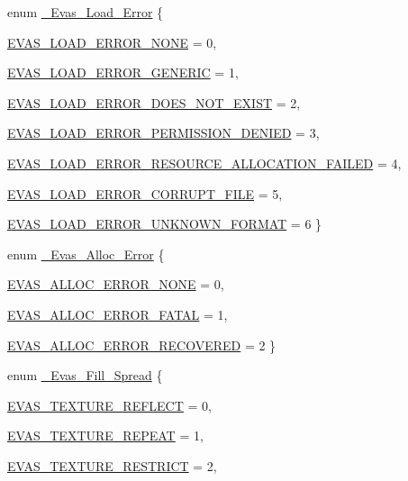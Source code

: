 \begin{DoxyCompactItemize}
enum \hyperlink{Evas_8h_ac6e5fe4a54ab26d2d9ceaefff0962b5f}{\_\-Evas\_\-Load\_\-Error} \{ \par
\hyperlink{Evas_8h_ac6e5fe4a54ab26d2d9ceaefff0962b5fa016233a6ae27765a3aa2759753c112ac}{EVAS\_\-LOAD\_\-ERROR\_\-NONE} =  0, 
\par
\hyperlink{Evas_8h_ac6e5fe4a54ab26d2d9ceaefff0962b5fab9e5061c8c74bcd8a283fb7598a8b81d}{EVAS\_\-LOAD\_\-ERROR\_\-GENERIC} =  1, 
\par
\hyperlink{Evas_8h_ac6e5fe4a54ab26d2d9ceaefff0962b5fa0230814bb1fe9cb194e253e840aa8529}{EVAS\_\-LOAD\_\-ERROR\_\-DOES\_\-NOT\_\-EXIST} =  2, 
\par
\hyperlink{Evas_8h_ac6e5fe4a54ab26d2d9ceaefff0962b5fa17e04ec01edcabf21f33537872fb7200}{EVAS\_\-LOAD\_\-ERROR\_\-PERMISSION\_\-DENIED} =  3, 
\par
\hyperlink{Evas_8h_ac6e5fe4a54ab26d2d9ceaefff0962b5fa22a36ddde85a5fd1c1f2e68d7052f6f4}{EVAS\_\-LOAD\_\-ERROR\_\-RESOURCE\_\-ALLOCATION\_\-FAILED} =  4, 
\par
\hyperlink{Evas_8h_ac6e5fe4a54ab26d2d9ceaefff0962b5fa7ba46c8865335ca085213b7dbf039a75}{EVAS\_\-LOAD\_\-ERROR\_\-CORRUPT\_\-FILE} =  5, 
\par
\hyperlink{Evas_8h_ac6e5fe4a54ab26d2d9ceaefff0962b5fa604b6c7bf6345c773d3083707d9f0a80}{EVAS\_\-LOAD\_\-ERROR\_\-UNKNOWN\_\-FORMAT} =  6
 \}
\item 
enum \hyperlink{Evas_8h_a1adf9f604f763f2a8db12a484ca199cb}{\_\-Evas\_\-Alloc\_\-Error} \{ \par
\hyperlink{Evas_8h_a1adf9f604f763f2a8db12a484ca199cba22bbdd0a96a670bbddd6789f91921af8}{EVAS\_\-ALLOC\_\-ERROR\_\-NONE} =  0, 
\par
\hyperlink{Evas_8h_a1adf9f604f763f2a8db12a484ca199cbaba4052a7c95452ff5c6f2b615a655d8e}{EVAS\_\-ALLOC\_\-ERROR\_\-FATAL} =  1, 
\par
\hyperlink{Evas_8h_a1adf9f604f763f2a8db12a484ca199cba5c6259613c3d063813f3b094f9d5bf8e}{EVAS\_\-ALLOC\_\-ERROR\_\-RECOVERED} =  2
 \}
\item 
enum \hyperlink{Evas_8h_a830349cff0c676505905e79e1db0f738}{\_\-Evas\_\-Fill\_\-Spread} \{ \par
\hyperlink{Evas_8h_a830349cff0c676505905e79e1db0f738a31a744eacb64fea060a008aafc7ff760}{EVAS\_\-TEXTURE\_\-REFLECT} =  0, 
\par
\hyperlink{Evas_8h_a830349cff0c676505905e79e1db0f738ab47a8ad83b953d575eeb18d94626d5e2}{EVAS\_\-TEXTURE\_\-REPEAT} =  1, 
\par
\hyperlink{Evas_8h_a830349cff0c676505905e79e1db0f738a78f264dbe65169a29f4c08e62cc57136}{EVAS\_\-TEXTURE\_\-RESTRICT} =  2, 

\end{DoxyCompactItemize}
